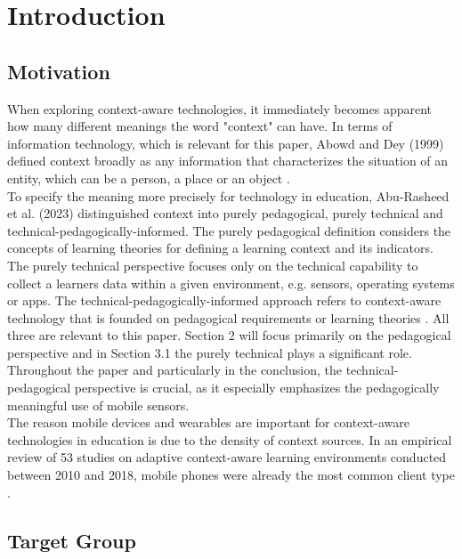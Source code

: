 \documentclass[runningheads]{llncs}
\begin{document}
\section{Introduction}

\subsection{Motivation}

When exploring context-aware technologies, it immediately becomes apparent how many different meanings the word "context" can have. In terms of information technology, which is relevant for this paper, Abowd and Dey (1999) defined context broadly as any information that characterizes the situation of an entity, which can be a person, a place or an object \cite{abowd_towards_1999}. \\
To specify the meaning more precisely for technology in education, Abu-Rasheed et al. (2023) distinguished context into purely pedagogical, purely technical and technical-pedagogically-informed. The purely pedagogical definition considers the concepts of learning theories for defining a learning context and its indicators. The purely technical perspective focuses only on the technical capability to collect a learners data within a given environment, e.g. sensors, operating systems or apps. The technical-pedagogically-informed approach refers to context-aware technology that is founded on pedagogical requirements or learning theories \cite{abu-rasheed_context_2023}. All three are relevant to this paper. Section 2 will focus primarily on the pedagogical perspective and in Section 3.1 the purely technical plays a significant role. Throughout the paper and particularly in the conclusion, the technical-pedagogical perspective is crucial, as it especially emphasizes the pedagogically meaningful use of mobile sensors. \\
The reason mobile devices and wearables are important for context-aware technologies in education is due to the density of context sources. In an empirical review of 53 studies on adaptive context-aware learning environments conducted between 2010 and 2018, mobile phones were already the most common client type \cite{hasanov_survey_2019}.

\subsection{Target Group}
\end{document}
